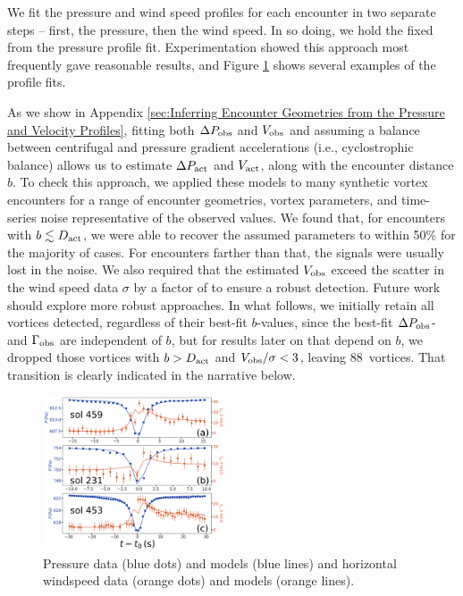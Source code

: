 \documentclass[linenumbers,trackchanges]{aastex63}
\newcommand{\boverDactltone}{88}
\begin{document}
We fit the pressure and wind speed profiles for each encounter in two separate steps -- first, the pressure, then the wind speed. In so doing, we hold the  fixed from the pressure profile fit.  Experimentation showed this approach most frequently gave reasonable results, and Figure \ref{fig:vortices_and_windspeed} shows several examples of the profile fits. 

As we show in Appendix \ref{sec:Inferring Encounter Geometries from the Pressure and Velocity Profiles}, fitting both $\Delta P_{\rm obs}$ and $V_{\rm obs}$ and assuming a balance between centrifugal and pressure gradient accelerations (i.e., cyclostrophic balance) allows us to estimate $\Delta P_{\rm act}$ and $V_{\rm act}$, along with the encounter distance $b$. To check this approach, we applied these models to many synthetic vortex encounters for a range of encounter geometries, vortex parameters, and time-series noise representative of the observed values. We found that, for encounters with $b \lesssim D_{\rm act}$, we were able to recover the assumed parameters to within 50\% for the majority of cases. For encounters farther than that, the signals were usually lost in the noise. We also required that the estimated $V_{\rm obs}$ exceed the scatter in the wind speed data $\sigma$ by a factor of  to ensure a robust detection. Future work should explore more robust approaches. In what follows, we initially retain all vortices detected, regardless of their best-fit $b$-values, since the best-fit $\Delta P_{\rm obs}$- and $\Gamma_{\rm obs}$ are independent of $b$, but for results later on that depend on $b$, we dropped those vortices with $b > D_{\rm act}$ and $V_{\rm obs}/\sigma < 3$, leaving \boverDactltone\ vortices. That transition is clearly indicated in the narrative below.

\begin{figure}
\centering
\includegraphics[width=0.48\textwidth]{figures/vortices_and_windspeed.png}
\caption{Pressure data (blue dots) and models (blue lines) and horizontal windspeed data (orange dots) and models (orange lines). \label{fig:vortices_and_windspeed}}
\end{figure}
\end{document}
